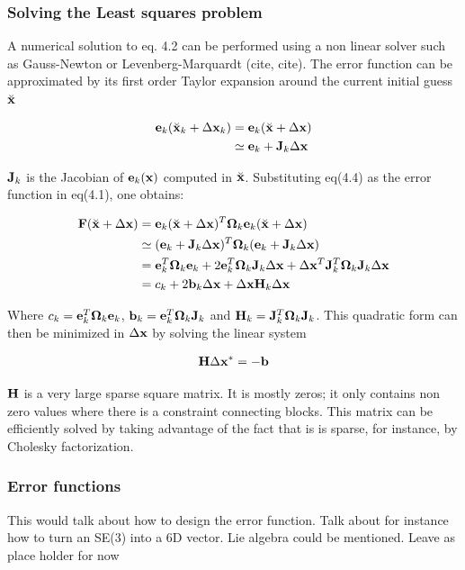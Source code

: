 \subsubsection{Solving the Least squares problem}

A numerical solution to eq. 4.2 can be performed using a non linear solver such as Gauss-Newton or Levenberg-Marquardt (cite, cite).  The error function can be approximated by its first order Taylor expansion around the current initial guess $\breve{\mathbf x}$

\begin{align}
  \mathbf e_k(\breve{\mathbf x}_k + \Delta \mathbf x_k) &= \mathbf e_k(\breve{\mathbf x} + \Delta \mathbf x) \\
      & \simeq \mathbf e_k + \mathbf J_k \Delta \mathbf x
\end{align}

$\mathbf J_k$ is the Jacobian of $\mathbf e_k(\mathbf x)$ computed in $\breve{\mathbf x}$.  Substituting eq(4.4) as the error function in eq(4.1), one obtains:

\begin{align}
  \mathbf F(\breve{\mathbf x} + \Delta \mathbf x) &= \mathbf e_k(\breve{\mathbf x} + \Delta \mathbf x)^T \mathbf \Omega_k \mathbf e_k(\breve{\mathbf x} + \Delta \mathbf x) \\
  & \simeq (\mathbf e_k + \mathbf J_k \Delta \mathbf x)^T 
    \mathbf \Omega_k 
    (\mathbf e_k + \mathbf J_k \Delta \mathbf x) \\
  &= \mathbf e_k^T \mathbf \Omega_k \mathbf e_k 
    + 2 \mathbf e_k^T \mathbf \Omega_k \mathbf J_k \Delta \mathbf x 
    + \Delta \mathbf x^T \mathbf J_k^T \mathbf \Omega_k \mathbf J_k \Delta \mathbf x \\
  &= c_k + 2\mathbf b_k \Delta \mathbf x + \Delta \mathbf x \mathbf H_k \Delta \mathbf x
\end{align}

Where $c_k = \mathbf e_k^T \mathbf \Omega_k \mathbf e_k$, $\mathbf b_k = \mathbf e_k^T \mathbf \Omega_k \mathbf J_k$ and $\mathbf H_k = \mathbf J_k^T \mathbf \Omega_k \mathbf J_k$. This quadratic form can then be minimized in $\Delta \mathbf x$ by solving the linear system

\begin{align}
   \mathbf H \Delta \mathbf x^* = -\mathbf b
\end{align}

$\mathbf H$ is a very large sparse square matrix.  It is mostly zeros; it only contains non zero values where there is a constraint connecting blocks.  This matrix can be efficiently solved by taking advantage of the fact that is is sparse, for instance, by Cholesky factorization.

\subsubsection{Error functions}
This would talk about how to design the error function.  Talk about for instance how to turn an SE(3) into a 6D vector.  Lie algebra could be mentioned. Leave as place holder for now

